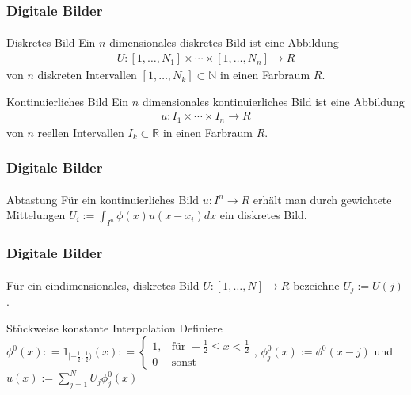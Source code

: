 \documentclass{beamer}
\begin{document}
\begin{frame}
    \frametitle{Digitale Bilder}
\framesubtitle{}

   \begin{block}{Diskretes Bild}
Ein $n$ dimensionales diskretes Bild ist eine Abbildung 
\begin{align*}
U : [1, \ldots, N_1] \times   \cdots \times [1, \ldots, N_n]   \to R
\end{align*}
von $n$ diskreten Intervallen  $[1, \ldots, N_k]  \subset \mathbb{N}$  in einen Farbraum $R$.
\end{block}

   \begin{block}{Kontinuierliches Bild}
Ein $n$ dimensionales kontinuierliches Bild ist eine Abbildung 
\begin{align*}
u : I_1 \times   \cdots \times I_n   \to R
\end{align*}
von $n$ reellen Intervallen $I_k \subset \mathbb{R}$ in einen Farbraum $R$.
\end{block}

 \end{frame}


\begin{frame}
    \frametitle{Digitale Bilder}
\framesubtitle{}
\begin{block}{Abtastung}
Für ein kontinuierliches  Bild $u : I^n \to R$ erhält man durch gewichtete Mittelungen
$U_i := \int_{I^n} \phi (x) u(x - x_i) dx$ ein diskretes Bild. 
\end{block}
 \end{frame}

\begin{frame}
    \frametitle{Digitale Bilder}
\framesubtitle{}
    \begin{block}{}
Für ein eindimensionales, diskretes Bild $U : [1, \ldots, N]  \to R$ bezeichne  $U_{j} := U(j)$.
\end{block}
    \begin{block}{Stückweise konstante Interpolation}
Definiere $\phi^0 (x) : = 1_{ [-\frac{1} {2} ,  \frac{1} {2}) }(x) : =\begin{cases}
   1 , & \text{für } -\frac{1} {2}  \leq x < \frac{1} {2}  \\
    0  & \text{sonst } 
  \end{cases} $, $\phi^0_j(x):= \phi^0 (x - j)$ und
 $u(x) := \sum_{j=1}^{N} U_j \phi^0_j(x)$ 
\end{block}

 \end{frame}
\end{document}
